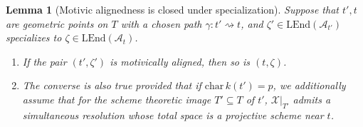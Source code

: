 \documentclass[11pt, letterpaper]{amsart}
\theoremstyle{plain}
\newtheorem{lemma}[theorem]{Lemma}
\theoremstyle{definition}
\newcommand{\<}{\langle}
\renewcommand{\>}{\rangle}
\newcommand{\sA}{\mathcal{A}}
\newcommand{\sX}{\mathcal{X}}
\newcommand{\LEnd}{\mathrm{LEnd}}
\begin{document}
\begin{lemma}[Motivic alignedness is closed under specialization]
\label{lem: def invariance of MA}
    Suppose that $t', t$ are geometric points on $T$ with a chosen path $\gamma: t' \rightsquigarrow t$, 
    and $\zeta' \in \LEnd(\sA_{t'})$ specializes to $\zeta \in \LEnd(\sA_t)$.
    \begin{enumerate}[label=\upshape{(\alph*)}]
        \item If the pair $(t', \zeta')$ is motivically aligned, then so is $(t, \zeta)$.
        \item\label{item: def invariance of MA converse} The converse is also true provided that if $\mathrm{char\,} k(t') = p$, we additionally assume that for the scheme theoretic image $T' \subseteq T$ of $t'$, $\sX|_{T'}$ admits a simultaneous resolution whose total space is a projective scheme near $t$. 
    \end{enumerate} 
\end{lemma}
\end{document}
